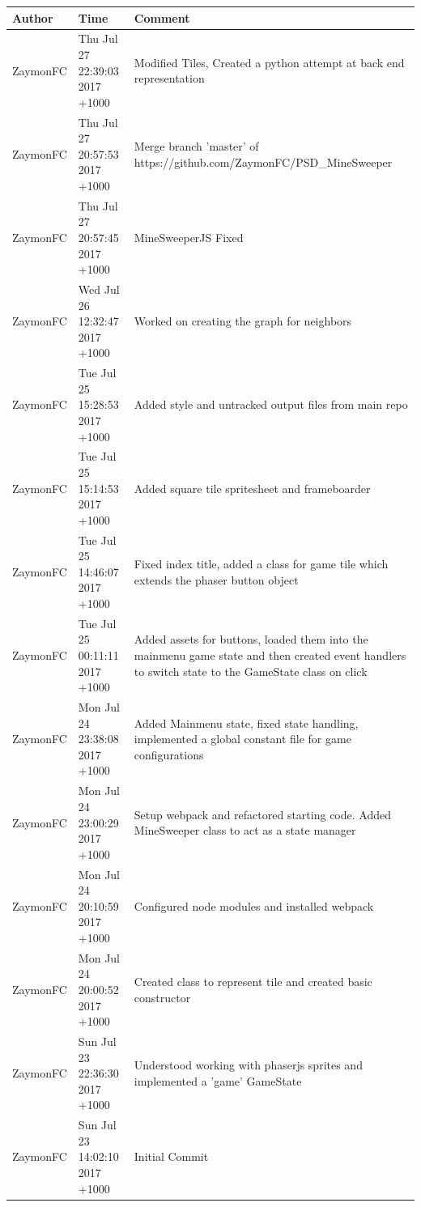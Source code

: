 \documentclass[12pt, a4]{report}
\begin{document}
	\begin{table}[!h]
		\begin{tabular}{ll p{7cm}}
			Author				  & Time   			& Comment \\ \hline
			
			ZaymonFC & Thu Jul 27 22:39:03 2017 +1000 & Modified Tiles, Created a python attempt at back end representation \\
			ZaymonFC & Thu Jul 27 20:57:53 2017 +1000 & Merge branch 'master' of https://github.com/ZaymonFC/PSD\_MineSweeper \\
			ZaymonFC & Thu Jul 27 20:57:45 2017 +1000 & MineSweeperJS Fixed \\
			ZaymonFC & Wed Jul 26 12:32:47 2017 +1000 & Worked on creating the graph for neighbors \\
			ZaymonFC & Tue Jul 25 15:28:53 2017 +1000 & Added style and untracked output files from main repo \\
			ZaymonFC & Tue Jul 25 15:14:53 2017 +1000 & Added square tile spritesheet and frameboarder \\
			ZaymonFC & Tue Jul 25 14:46:07 2017 +1000 & Fixed index title, added a class for game tile which extends the phaser button object \\
			ZaymonFC & Tue Jul 25 00:11:11 2017 +1000 & Added assets for buttons, loaded them into the mainmenu game state and then created event handlers to switch state to the GameState class on click \\
			ZaymonFC & Mon Jul 24 23:38:08 2017 +1000 & Added Mainmenu state, fixed state handling, implemented a global constant file for game configurations \\
			ZaymonFC & Mon Jul 24 23:00:29 2017 +1000 & Setup webpack and refactored starting code. Added MineSweeper class to act as a state manager \\
			ZaymonFC & Mon Jul 24 20:10:59 2017 +1000 & Configured node modules and installed webpack \\
			ZaymonFC & Mon Jul 24 20:00:52 2017 +1000 & Created class to represent tile and created basic constructor \\
			ZaymonFC & Sun Jul 23 22:36:30 2017 +1000 & Understood working with phaserjs sprites and implemented a 'game' GameState \\
			ZaymonFC & Sun Jul 23  14:02:10 2017 +1000 & Initial Commit
		\end{tabular}
	\end{table}

\newpage
\clearpage
\end{document}

